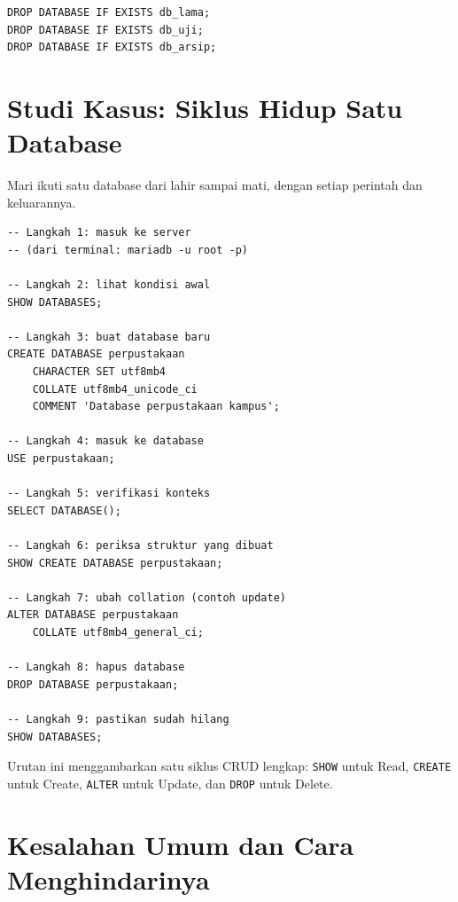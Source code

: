 \documentclass[11pt,a4paper]{article}
\begin{document}
\begin{lstlisting}[style=code]
DROP DATABASE IF EXISTS db_lama;
DROP DATABASE IF EXISTS db_uji;
DROP DATABASE IF EXISTS db_arsip;
\end{lstlisting}

\section{Studi Kasus: Siklus Hidup Satu Database}

Mari ikuti satu database dari lahir sampai mati, dengan setiap perintah dan keluarannya.

\begin{lstlisting}[style=code]
-- Langkah 1: masuk ke server
-- (dari terminal: mariadb -u root -p)

-- Langkah 2: lihat kondisi awal
SHOW DATABASES;

-- Langkah 3: buat database baru
CREATE DATABASE perpustakaan
    CHARACTER SET utf8mb4
    COLLATE utf8mb4_unicode_ci
    COMMENT 'Database perpustakaan kampus';

-- Langkah 4: masuk ke database
USE perpustakaan;

-- Langkah 5: verifikasi konteks
SELECT DATABASE();

-- Langkah 6: periksa struktur yang dibuat
SHOW CREATE DATABASE perpustakaan;

-- Langkah 7: ubah collation (contoh update)
ALTER DATABASE perpustakaan
    COLLATE utf8mb4_general_ci;

-- Langkah 8: hapus database
DROP DATABASE perpustakaan;

-- Langkah 9: pastikan sudah hilang
SHOW DATABASES;
\end{lstlisting}

Urutan ini menggambarkan satu siklus CRUD lengkap: \texttt{SHOW} untuk Read, \texttt{CREATE} untuk Create, \texttt{ALTER} untuk Update, dan \texttt{DROP} untuk Delete.

\section{Kesalahan Umum dan Cara Menghindarinya}
\end{document}
